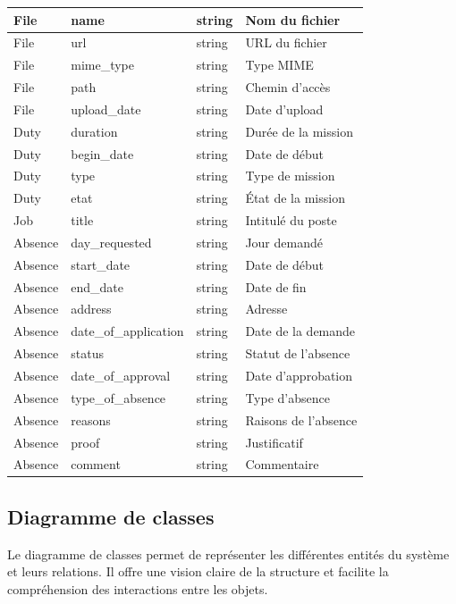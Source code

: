 \begin{longtable}{|p{3.5cm}|p{3.5cm}|p{3cm}|p{5cm}|}
    File & name & string & Nom du fichier \\
    \hline
    File & url & string & URL du fichier \\
    \hline
    File & mime\_type & string & Type MIME \\
    \hline
    File & path & string & Chemin d'accès \\
    \hline
    File & upload\_date & string & Date d'upload \\
    \hline

    Duty & duration & string & Durée de la mission \\
    \hline
    Duty & begin\_date & string & Date de début \\
    \hline
    Duty & type & string & Type de mission \\
    \hline
    Duty & etat & string & État de la mission \\
    \hline

    Job & title & string & Intitulé du poste \\
    \hline

    Absence & day\_requested & string & Jour demandé \\
    \hline
    Absence & start\_date & string & Date de début \\
    \hline
    Absence & end\_date & string & Date de fin \\
    \hline
    Absence & address & string & Adresse \\
    \hline
    Absence & date\_of\_application & string & Date de la demande \\
    \hline
    Absence & status & string & Statut de l'absence \\
    \hline
    Absence & date\_of\_approval & string & Date d'approbation \\
    \hline
    Absence & type\_of\_absence & string & Type d'absence \\
    \hline
    Absence & reasons & string & Raisons de l'absence \\
    \hline
    Absence & proof & string & Justificatif \\
    \hline
    Absence & comment & string & Commentaire \\
    \hline

\end{longtable}




\subsection{Diagramme de classes}
Le diagramme de classes permet de représenter les différentes entités du système et leurs relations. Il offre une vision claire de la structure et facilite la compréhension des interactions entre les objets.

